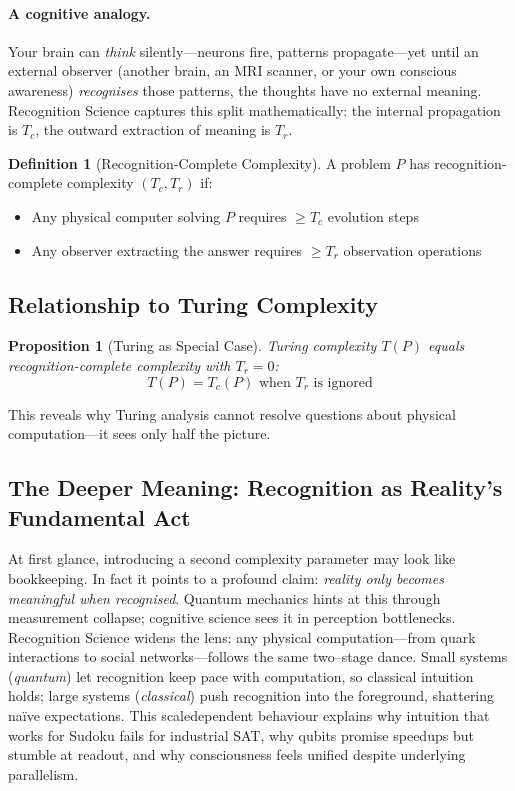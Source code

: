 \documentclass[11pt]{article}
\theoremstyle{plain}
\newtheorem{proposition}[theorem]{Proposition}
\theoremstyle{definition}
\newtheorem{definition}[theorem]{Definition}
\theoremstyle{remark}
\begin{document}
\paragraph{A cognitive analogy.}  Your brain can \emph{think} silently---neurons fire, patterns propagate---yet until an external observer (another brain, an MRI scanner, or your own conscious awareness) \emph{recognises} those patterns, the thoughts have no external meaning.  Recognition Science captures this split mathematically: the internal propagation is $T_c$, the outward extraction of meaning is $T_r$.

\begin{definition}[Recognition-Complete Complexity]
A problem $P$ has recognition-complete complexity $(T_c, T_r)$ if:
\begin{itemize}
\item Any physical computer solving $P$ requires $\geq T_c$ evolution steps
\item Any observer extracting the answer requires $\geq T_r$ observation operations
\end{itemize}
\end{definition}

\subsection{Relationship to Turing Complexity}

\begin{proposition}[Turing as Special Case]
Turing complexity $T(P)$ equals recognition-complete complexity with $T_r = 0$:
\[
T(P) = T_c(P) \text{ when } T_r \text{ is ignored}
\]
\end{proposition}

This reveals why Turing analysis cannot resolve questions about physical computation—it sees only half the picture.

\subsection{The Deeper Meaning: Recognition as Reality's Fundamental Act}

At first glance, introducing a second complexity parameter may look like bookkeeping.  In fact it points to a profound claim: \emph{reality only becomes meaningful when recognised}.  Quantum mechanics hints at this through measurement collapse; cognitive science sees it in perception bottlenecks.  Recognition Science widens the lens: any physical computation---from quark interactions to social networks---follows the same two--stage dance.  Small systems (\textit{quantum}) let recognition keep pace with computation, so classical intuition holds; large systems (\textit{classical}) push recognition into the foreground, shattering naïve expectations.  This scale\textendash dependent behaviour explains why intuition that works for Sudoku fails for industrial SAT, why qubits promise speed\textendash ups but stumble at readout, and why consciousness feels unified despite underlying parallelism.
\end{document}

